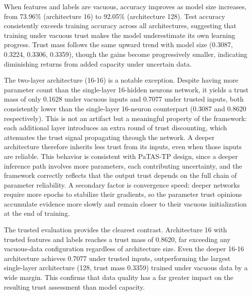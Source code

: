 When features and labels are vacuous, accuracy improves as model size increases, from 73.96\% (architecture 16) to 92.05\% (architecture 128). Test accuracy consistently exceeds training accuracy across all architectures, suggesting that training under vacuous trust makes the model underestimate its own learning progress. Trust mass follows the same upward trend with model size (0.3087, 0.3224, 0.3306, 0.3359), though the gains become progressively smaller, indicating diminishing returns from added capacity under uncertain data.

The two-layer architecture (16-16) is a notable exception. Despite having more parameter count than the single-layer 16-hidden neurons network, it yields a trust mass of only 0.1628 under vacuous inputs and 0.7077 under trusted inputs, both consistently lower than the single-layer 16-neuron counterpart (0.3087 and 0.8620 respectively). This is not an artifact but a meaningful property of the framework: each additional layer introduces an extra round of trust discounting, which attenuates the trust signal propagating through the network. A deeper architecture therefore inherits less trust from its inputs, even when those inputs are reliable. This behavior is consistent with \ac{PaTAS-TP} design, since a deeper inference path involves more parameters, each contributing uncertainty, and the framework correctly reflects that the output trust depends on the full chain of parameter reliability. A secondary factor is convergence speed: deeper networks require more epochs to stabilize their gradients, so the parameter trust opinions accumulate evidence more slowly and remain closer to their vacuous initialization at the end of training.

The trusted evaluation provides the clearest contrast. Architecture 16 with trusted features and labels reaches a trust mass of 0.8620, far exceeding any vacuous-data configuration regardless of architecture size. Even the deeper 16-16 architecture achieves 0.7077 under trusted inputs, outperforming the largest single-layer architecture (128, trust mass 0.3359) trained under vacuous data by a wide margin. This confirms that data quality has a far greater impact on the resulting trust assessment than model capacity.

